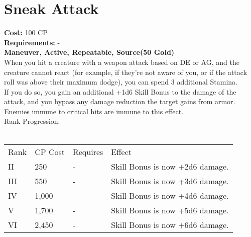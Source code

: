 \section{Sneak Attack}\label{maneuver:sneakAttack}
\textbf{Cost:} 100 CP\\
\textbf{Requirements:} -\\
\textbf{Maneuver, Active, Repeatable, Source(50 Gold)}\\
When you hit a creature with a weapon attack based on DE or AG, and the creature cannot react (for example, if they're not aware of you, or if the attack roll was above their maximum dodge), you can spend 3 additional Stamina.\\
If you do so, you gain an additional +1d6 Skill Bonus to the damage of the attack, and you bypass any damage reduction the target gains from armor.\\
Enemies immune to critical hits are immune to this effect.
\\
Rank Progression:\\
\\
\begin{tabular}{l | l | l | l}
	Rank & CP Cost & Requires & Effect\\
	II & 250 & - & Skill Bonus is now +2d6 damage.\\
	III & 550 & - &  Skill Bonus is now +3d6 damage.\\
	IV & 1,000 & - &  Skill Bonus is now +4d6 damage.\\
	V & 1,700 & - &  Skill Bonus is now +5d6 damage.\\
	VI & 2,450 & - &  Skill Bonus is now +6d6 damage.\\
\end{tabular}
